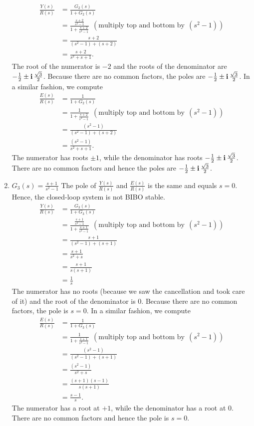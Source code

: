\begin{enumerate}
\begin{align*}
    \frac{Y(s)}{R(s)} & = \frac{G_2(s)}{1 + G_2(s)} \\
    & =  \frac{\frac{s+2}{s^2-1}}{1 + \frac{s+2}{s^2-1}}~~ (\text{multiply top and bottom by}~~(s^2-1))\\
    & = \frac{s+2}{(s^2-1) + (s+2)} \\
    & = \frac{s+2}{s^2+s +1}.
\end{align*}
The root of the numerator is $-2$ and the roots of the denominator are $-\frac{1}{2} \pm \mathop{\bm{\mathrm i}} \frac{\sqrt{3}}{2}$.  Because there are no common factors, the poles are $-\frac{1}{2} \pm \mathop{\bm{\mathrm i}} \frac{\sqrt{3}}{2}$. In a similar fashion, we compute
\begin{align*}
    \frac{E(s)}{R(s)} & = \frac{1}{1 + G_2(s)} \\
    & =  \frac{1}{1 + \frac{s+2}{s^2-1}}~~ (\text{multiply top and bottom by}~~(s^2-1))\\
    & = \frac{(s^2-1)}{(s^2-1) +(s+ 2)} \\
    & = \frac{(s^2 - 1)}{s^2+s + 1}.
\end{align*}
The numerator has roots $\pm 1$, while the denominator has roots $-\frac{1}{2} \pm \mathop{\bm{\mathrm i}} \frac{\sqrt{3}}{2}$. There are no common factors and hence the poles are $-\frac{1}{2} \pm \mathop{\bm{\mathrm i}} \frac{\sqrt{3}}{2}$.

\item $G_3(s) = \frac{s+1}{s^2-1}$ \quad \Ans The pole of $\frac{Y(s)}{R(s)}$ and $\frac{E(s)}{R(s)}$ is the same and equals $s=0$. Hence, the closed-loop system is not BIBO stable.\\

\begin{align*}
    \frac{Y(s)}{R(s)} & = \frac{G_3(s)}{1 + G_3(s)} \\
    & =  \frac{\frac{s+1}{s^2-1}}{1 + \frac{s+1}{s^2-1}}~~ (\text{multiply top and bottom by}~~(s^2-1))\\
    & = \frac{s+1}{(s^2-1) + (s+1)} \\
    & = \frac{s+1}{s^2+s } \\
    & = \frac{s+1}{s (s+1) } \\
    & = \frac{1}{s}
\end{align*}
The numerator has no roots (because we saw the cancellation and took care of it) and the root of the denominator is  $0$.  Because there are no common factors, the pole is $s=0$. In a similar fashion, we compute
\begin{align*}
    \frac{E(s)}{R(s)} & = \frac{1}{1 + G_3(s)} \\
    & =  \frac{1}{1 + \frac{s+1}{s^2-1}}~~ (\text{multiply top and bottom by}~~(s^2-1))\\
    & = \frac{(s^2-1)}{(s^2-1) +(s+ 1)} \\
    & = \frac{(s^2 - 1)}{s^2+s} \\
    & =  \frac{(s+1)(s-1)}{s(s+1)}\\
    & = \frac{s-1}{s}.
\end{align*}
The numerator has a root at $+1$, while the denominator has a root at  $0$. There are no common factors and hence the pole is $s=0$.
\end{enumerate}


